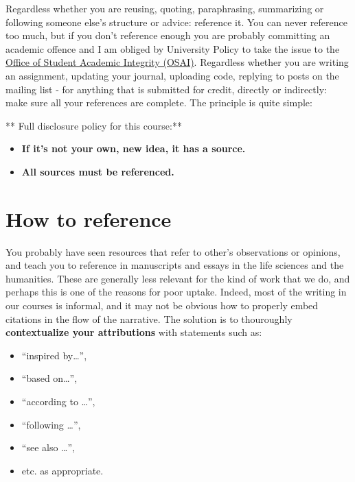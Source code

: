 \documentclass[]{book}
\providecommand{\tightlist}{%
  \setlength{\itemsep}{0pt}\setlength{\parskip}{0pt}}
\begin{document}
Regardless whether you are reusing, quoting, paraphrasing, summarizing
or following someone else's structure or advice: reference it. You can
never reference too much, but if you don't reference enough you are
probably committing an academic offence and I am obliged by University
Policy to take the issue to the
\href{https://www.artsci.utoronto.ca/current/academic-advising-and-support/student-academic-integrity}{Office
of Student Academic Integrity (OSAI)}. Regardless whether you are
writing an assignment, updating your journal, uploading code, replying
to posts on the mailing list - for anything that is submitted for
credit, directly or indirectly: make sure all your references are
complete. The principle is quite simple:

\begin{rmd-caution}
** Full disclosure policy for this course:**

\begin{itemize}
\tightlist
\item
  \textbf{If it's not your own, new idea, it has a source.}
\item
  \textbf{All sources must be referenced.}
\end{itemize}
\end{rmd-caution}

\section{How to reference}\label{how-to-reference}

You probably have seen resources that refer to other's observations or
opinions, and teach you to reference in manuscripts and essays in the
life sciences and the humanities. These are generally less relevant for
the kind of work that we do, and perhaps this is one of the reasons for
poor uptake. Indeed, most of the writing in our courses is informal, and
it may not be obvious how to properly embed citations in the flow of the
narrative. The solution is to thouroughly \textbf{contextualize your
attributions} with statements such as:

\begin{itemize}
\tightlist
\item
  ``inspired by\ldots{}'',
\item
  ``based on\ldots{}'',
\item
  ``according to \ldots{}'',
\item
  ``following \ldots{}'',
\item
  ``see also \ldots{}'',
\item
  etc. as appropriate.
\end{itemize}
\end{document}
